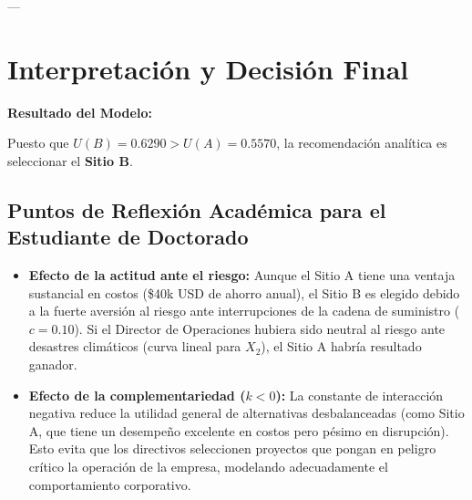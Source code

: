 \documentclass[11pt, letterpaper]{article}
\begin{document}
---

\section{Interpretación y Decisión Final}

\begin{center}
    \bfseries\color{FIMEgreen} Resultado del Modelo:
\end{center}
Puesto que $U(B) = 0.6290 > U(A) = 0.5570$, la recomendación analítica es seleccionar el \textbf{Sitio B}.

\subsection{Puntos de Reflexión Académica para el Estudiante de Doctorado}
\begin{itemize}
    \item \textbf{Efecto de la actitud ante el riesgo:} Aunque el Sitio A tiene una ventaja sustancial en costos (\$40k USD de ahorro anual), el Sitio B es elegido debido a la fuerte aversión al riesgo ante interrupciones de la cadena de suministro ($c=0.10$). Si el Director de Operaciones hubiera sido neutral al riesgo ante desastres climáticos (curva lineal para $X_2$), el Sitio A habría resultado ganador.
    \item \textbf{Efecto de la complementariedad ($k < 0$):} La constante de interacción negativa reduce la utilidad general de alternativas desbalanceadas (como Sitio A, que tiene un desempeño excelente en costos pero pésimo en disrupción). Esto evita que los directivos seleccionen proyectos que pongan en peligro crítico la operación de la empresa, modelando adecuadamente el comportamiento corporativo.
\end{itemize}
\end{document}
